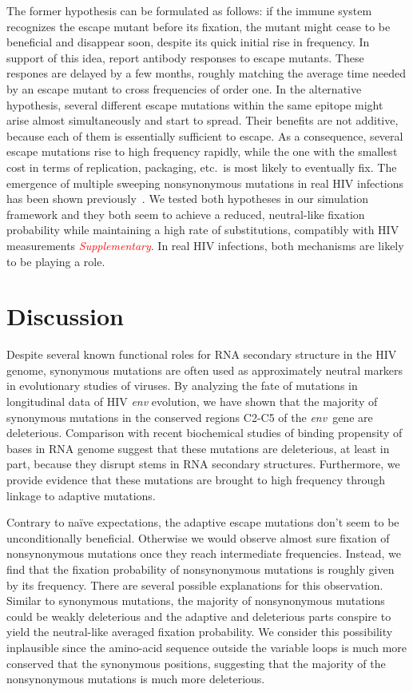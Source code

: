 \documentclass[rmp, twocolumn]{revtex4}
\newcommand{\comment}[1]{\textit{\textcolor{red}{#1}}}
\newcommand{\env}{\textit{env}}
\begin{document}
The former hypothesis can be formulated as follows: if the immune system
recognizes the escape mutant before its fixation, the mutant might cease to be
beneficial and disappear soon, despite its quick initial rise in frequency. In support of this idea,
\citet{richman_rapid_2003, bunnik_autologous_2008} report antibody responses to
escape mutants. These respones are delayed by a few months, roughly matching the
average time needed by an escape mutant to cross frequencies of order one.
In the alternative hypothesis, several different escape
mutations within the same epitope might arise almost simultaneously and start to
spread. Their benefits are not additive, because each of them is
essentially sufficient to escape. As a consequence, several escape mutations rise to
high frequency rapidly, while the one with the smallest cost in terms of replication,
packaging, etc.~is most likely to eventually fix. The emergence of
multiple sweeping nonsynonymous mutations in real HIV infections has been shown
previously~\citep{moore_limited_2009, bar_early_2012}.
We tested both hypotheses in our simulation framework and they both seem to
achieve a reduced, neutral-like fixation probability while maintaining a high
rate of substitutions, compatibly with HIV measurements \comment{Supplementary}.
In real HIV infections, both mechanisms are likely to be playing a role.

\section{Discussion}
Despite several known functional roles for RNA secondary structure in the HIV
genome, synonymous mutations are often used as approximately neutral markers in
evolutionary studies of viruses. By analyzing the fate of mutations in
longitudinal data of HIV \env{} evolution, we have shown that the majority of
synonymous mutations in the conserved regions C2-C5 of the \env~gene are deleterious.
Comparison with recent biochemical studies of binding propensity of bases in RNA
genome suggest that these mutations are deleterious, at least in part, because they disrupt
stems in RNA secondary structures. Furthermore, we provide evidence that these
mutations are brought to high frequency through linkage to adaptive mutations.

Contrary to na\"ive expectations, the adaptive escape mutations don't seem to be
unconditionally beneficial. Otherwise we would observe almost sure fixation of
nonsynonymous mutations once they reach intermediate frequencies. Instead, we
find that the fixation probability of nonsynonymous mutations is roughly given
by its frequency. There are several possible explanations for this observation. 
Similar to synonymous mutations, the majority of nonsynonymous mutations could
be weakly deleterious and the adaptive and deleterious parts conspire to yield
the neutral-like averaged fixation probability. We consider this possibility
inplausible since the amino-acid sequence outside the variable loops is much
more conserved that the synonymous positions, suggesting that the majority of
the nonsynonymous mutations is much more deleterious. 
\end{document}
